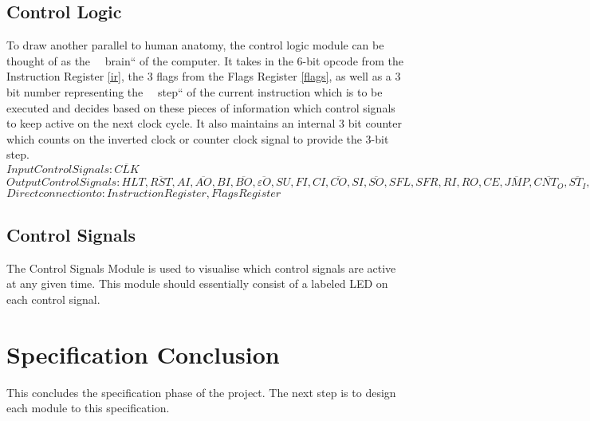 \subsection{Control Logic} \label{control-logic}
To draw another parallel to human anatomy, the control logic module can be thought of as the ~~brain`` of the computer.
It takes in the 6-bit opcode from the Instruction Register \ref{ir}, the 3 flags from the Flags Register \ref{flags}, as well as
a 3 bit number representing the ~~step`` of the current instruction which is to be executed and decides based on these pieces
of information which control signals to keep active on the next clock cycle. It also maintains an internal 3 bit counter which
counts on the inverted clock or counter clock signal to provide the 3-bit step. \\
\textbf{$Input Control Signals: \overline{CLK}$}
\textbf{$Output Control Signals: HLT, \overline{RST}, AI, \overline{AO}, BI, \overline{BO}, \overline{\varepsilon O}, SU, FI, CI, \overline{CO}, SI, \overline{SO}, SFL, SFR, RI, RO, CE, \overline{JMP}, \overline{CNT_O}, \overline{ST_I}, \overline{ST_D}, \overline{ST_J}, \overline{ST_O}, OUT, \overline{E}, R/\overline{W}, MI, II, \overline{IO}$}
\textbf{$Direct connection to: Instruction Register, Flags Register$}


\subsection{Control Signals} \label{control-sigs}
The Control Signals Module is used to visualise which control signals are active at any given time. This module should
essentially consist of a labeled LED on each control signal.

\section{Specification Conclusion}
This concludes the specification phase of the project. The next step is to design each module to this specification.

